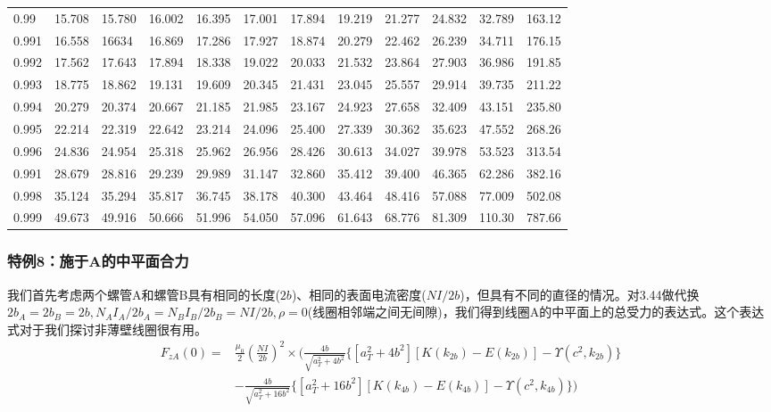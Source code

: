 \begin{table}[htbp]
\begin{tabular}{|l||l|l|l|l|l|l|l|l|l|l|l|}
		0.99  & 15.708 & 15.780 & 16.002 & 16.395 & 17.001 & 17.894 & 19.219 & 21.277 & 24.832 & 32.789 & 163.12 \\ 
		0.991 & 16.558 & 16634  & 16.869 & 17.286 & 17.927 & 18.874 & 20.279 & 22.462 & 26.239 & 34.711 & 176.15 \\ 
		0.992 & 17.562 & 17.643 & 17.894 & 18.338 & 19.022 & 20.033 & 21.532 & 23.864 & 27.903 & 36.986 & 191.85 \\
		0.993 & 18.775 & 18.862 & 19.131 & 19.609 & 20.345 & 21.431 & 23.045 & 25.557 & 29.914 & 39.735 & 211.22 \\
		0.994 & 20.279 & 20.374 & 20.667 & 21.185 & 21.985 & 23.167 & 24.923 & 27.658 & 32.409 & 43.151 & 235.80 \\
		0.995 & 22.214 & 22.319 & 22.642 & 23.214 & 24.096 & 25.400 & 27.339 & 30.362 & 35.623 & 47.552 & 268.26 \\
		0.996 & 24.836 & 24.954 & 25.318 & 25.962 & 26.956 & 28.426 & 30.613 & 34.027 & 39.978 & 53.523 & 313.54 \\
		0.991 & 28.679 & 28.816 & 29.239 & 29.989 & 31.147 & 32.860 & 35.412 & 39.400 & 46.365 & 62.286 & 382.16 \\
		0.998 & 35.124 & 35.294 & 35.817 & 36.745 & 38.178 & 40.300 & 43.464 & 48.416 & 57.088 & 77.009 & 502.08 \\ 
		0.999 & 49.673 & 49.916 & 50.666 & 51.996 & 54.050 & 57.096 & 61.643 & 68.776 & 81.309 & 110.30 & 787.66 \\ \hline
	\end{tabular}
\end{table}

\subsubsection{特例8：施于A的中平面合力}
我们首先考虑两个螺管A和螺管B具有相同的长度($2b$)、相同的表面电流密度($NI/2b$)，但具有不同的直径的情况。对3.44做代换$2b_A = 2b_B = 2b, N_A I_A/2b_A = N_B I_B/2b_B = N I/2b,\rho=0$(线圈相邻端之间无间隙)，我们得到线圈A的中平面上的总受力的表达式。这个表达式对于我们探讨非薄壁线圈很有用。
\begin{equation}
\begin{split}
F_{zA}(0)=&\frac{\mu_0}{2}(\frac{NI}{2b})^2\times\bigg(\frac{4b}{\sqrt{a_T^2+4b^2}} \{[a_T^2+4b^2][K(k_{2b})-E(k_{2b})]-\Upsilon(c^2,k_{2b}) \}\\
&-\frac{4b}{\sqrt{a_T^2+16b^2}} \{[a_T^2+16b^2][K(k_{4b})-E(k_{4b})]-\Upsilon(c^2,k_{4b}) \}\bigg)
\end{split}
\end{equation}

